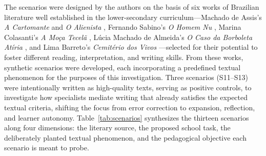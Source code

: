 \documentclass{sbc2023}%
\begin{document}
The scenarios were designed by the authors on the basis of six works of Brazilian literature well established in the lower-secondary curriculum---Machado de Assis's \textit{A Cartomante} \citep{machado1896cartomante} and \textit{O Alienista} \citep{machado1882alienista}, Fernando Sabino's \textit{O Homem Nu} \citep{sabino1960homemnu}, Marina Colasanti's \textit{A Mo\c{c}a Tecel\~a} \citep{colasanti1982tecela}, L\'ucia Machado de Almeida's \textit{O Caso da Borboleta At\'iria} \citep{almeida1975borboleta}, and Lima Barreto's \textit{Cemit\'erio dos Vivos} \citep{limabarreto1956cemiterio}---selected for their potential to foster different reading, interpretation, and writing skills. From these works, synthetic scenarios were developed, each incorporating a predefined textual phenomenon for the purposes of this investigation. Three scenarios (S11--S13) were intentionally written as high-quality texts, serving as positive controls, to investigate how specialists mediate writing that already satisfies the expected textual criteria, shifting the focus from error correction to expansion, reflection, and learner autonomy. Table~\ref{tab:scenarios} synthesizes the thirteen scenarios along four dimensions: the literary source, the proposed school task, the deliberately planted textual phenomenon, and the pedagogical objective each scenario is meant to probe.
\end{document}
